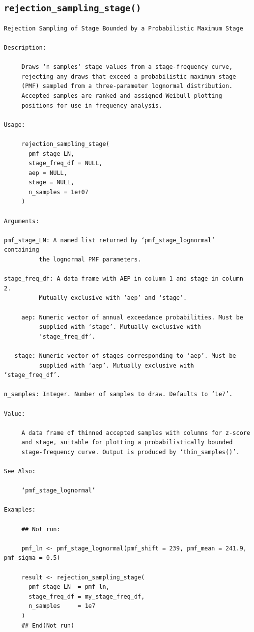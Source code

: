 \documentclass[
  letterpaper,
  DIV=11,
  numbers=noendperiod]{scrreprt}
\begin{document}
\subsection{\texorpdfstring{\texttt{rejection\_sampling\_stage()}}{rejection\_sampling\_stage()}}\label{rejection_sampling_stage}

\begin{verbatim}
Rejection Sampling of Stage Bounded by a Probabilistic Maximum Stage

Description:

     Draws ‘n_samples’ stage values from a stage-frequency curve,
     rejecting any draws that exceed a probabilistic maximum stage
     (PMF) sampled from a three-parameter lognormal distribution.
     Accepted samples are ranked and assigned Weibull plotting
     positions for use in frequency analysis.

Usage:

     rejection_sampling_stage(
       pmf_stage_LN,
       stage_freq_df = NULL,
       aep = NULL,
       stage = NULL,
       n_samples = 1e+07
     )
     
Arguments:

pmf_stage_LN: A named list returned by ‘pmf_stage_lognormal’ containing
          the lognormal PMF parameters.

stage_freq_df: A data frame with AEP in column 1 and stage in column 2.
          Mutually exclusive with ‘aep’ and ‘stage’.

     aep: Numeric vector of annual exceedance probabilities. Must be
          supplied with ‘stage’. Mutually exclusive with
          ‘stage_freq_df’.

   stage: Numeric vector of stages corresponding to ‘aep’. Must be
          supplied with ‘aep’. Mutually exclusive with ‘stage_freq_df’.

n_samples: Integer. Number of samples to draw. Defaults to ‘1e7’.

Value:

     A data frame of thinned accepted samples with columns for z-score
     and stage, suitable for plotting a probabilistically bounded
     stage-frequency curve. Output is produced by ‘thin_samples()’.

See Also:

     ‘pmf_stage_lognormal’

Examples:

     ## Not run:
     
     pmf_ln <- pmf_stage_lognormal(pmf_shift = 239, pmf_mean = 241.9, pmf_sigma = 0.5)
     
     result <- rejection_sampling_stage(
       pmf_stage_LN  = pmf_ln,
       stage_freq_df = my_stage_freq_df,
       n_samples     = 1e7
     )
     ## End(Not run)
     
\end{verbatim}
\end{document}
